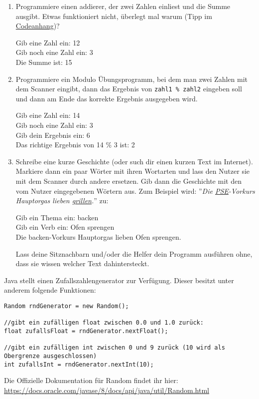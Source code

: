 \documentclass{../../sheet}
\begin{document}
\begin{enumerate}
    \item Programmiere einen addierer, der zwei Zahlen einliest und die Summe ausgibt. Etwas funktioniert nicht, überlegt mal warum (Tipp im \hyperlink{Aufgabe_2.1}{Codeanhang})?
\begin{ausgabe}
Gib eine Zahl ein: 12\\
Gib noch eine Zahl ein: 3\\
Die Summe ist: 15
\end{ausgabe}
    \item Programmiere ein Modulo Übungsprogramm, bei dem man zwei Zahlen mit dem Scanner eingibt, dann das Ergebnis von \texttt{zahl1 \% zahl2} eingeben soll und dann am Ende das korrekte Ergebnis ausgegeben wird.
\begin{ausgabe}
Gib eine Zahl ein: 14\\
Gib noch eine Zahl ein: 3\\
Gib dein Ergebnis ein: 6\\
Das richtige Ergebnis von 14 \% 3 ist: 2
\end{ausgabe}
    \item Schreibe eine kurze Geschichte (oder such dir einen kurzen Text im Internet). Markiere dann ein paar Wörter mit ihren Wortarten und lass den Nutzer sie mit dem Scanner durch andere ersetzen. Gib dann die Geschichte mit den vom Nutzer eingegebenen Wörtern aus. Zum Beispiel wird: ''\textit{Die \underline{PSE}-Vorkurs Hauptorgas lieben \underline{grillen}.}'' \space zu:
          \begin{ausgabe}
              Gib ein Thema ein: backen\\
              Gib ein Verb ein: Ofen sprengen\\
              Die backen-Vorkurs Hauptorgas lieben Ofen sprengen.
          \end{ausgabe}
          Lass deine Sitznachbarn und/oder die Helfer dein Programm ausführen ohne, dass sie wissen welcher Text dahintersteckt.
\end{enumerate}

\newpage
{}
Java stellt einen Zufallszahlengenerator zur Verfügung. Dieser besitzt unter anderem folgende Funktionen:

\begin{verbatim}
Random rndGenerator = new Random();

//gibt ein zufälligen float zwischen 0.0 und 1.0 zurück:
float zufallsFloat = rndGenerator.nextFloat();

//gibt ein zufälligen int zwischen 0 und 9 zurück (10 wird als Obergrenze ausgeschlossen)
int zufallsInt = rndGenerator.nextInt(10);
\end{verbatim}
Die Offizielle Dokumentation für Random findet ihr hier: \url{https://docs.oracle.com/javase/8/docs/api/java/util/Random.html}
\end{document}
